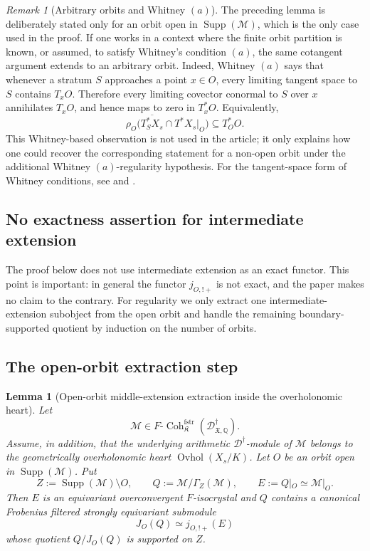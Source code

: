 \documentclass[11pt]{amsart}
\theoremstyle{plain}
\newtheorem{lemma}{Lemma}[section]
\theoremstyle{definition}
\theoremstyle{remark}
\newtheorem{remark}{Remark}[section]
\newcommand{\Ovhol}{\operatorname{Ovhol}}
\newcommand{\Coh}{\operatorname{Coh}}
\newcommand{\Supp}{\operatorname{Supp}}
\newcommand{\fstr}{\mathrm{fstr}}
\begin{document}
\begin{remark}[Arbitrary orbits and Whitney \((a)\)]
\label{rem:arbitrary-orbits-whitney-a}
The preceding lemma is deliberately stated only for an orbit open in
\(\Supp(\mathcal M)\), which is the only case used in the proof.  If one works
in a context where the finite orbit partition is known, or assumed, to satisfy
Whitney's condition \((a)\), the same cotangent argument extends to an arbitrary
orbit.  Indeed, Whitney \((a)\) says that whenever a stratum \(S\) approaches a
point \(x\in O\), every limiting tangent space to \(S\) contains
\(T_xO\).  Therefore every limiting covector conormal to \(S\) over \(x\)
annihilates \(T_xO\), and hence maps to zero in \(T_x^*O\).  Equivalently,
\[
  \rho_O\bigl(\overline{T^*_S X_s}\cap T^*X_s|_O\bigr)
  \subseteq T^*_O O.
\]
This Whitney-based observation is not used in the article; it only explains how
one could recover the corresponding statement for a non-open orbit under the
additional Whitney \((a)\)-regularity hypothesis.  For the tangent-space form of
Whitney conditions, see \cite[Part I, \S1.2]{GoreskyMacPherson} and
\cite[\S8.3]{KashiwaraSchapira}.
\end{remark}

\subsection{No exactness assertion for intermediate extension}

The proof below does not use intermediate extension as an exact functor.  This
point is important: in general the functor \(j_{O,!+}\) is not exact, and the
paper makes no claim to the contrary.  For regularity we only extract one
intermediate-extension subobject from the open orbit and handle the remaining
boundary-supported quotient by induction on the number of orbits.

\subsection{The open-orbit extraction step}

\begin{lemma}[Open-orbit middle-extension extraction inside the overholonomic heart]
\label{lem:middle-extension-extraction}
Let
\[
  \mathcal M\in
  F\text{-}\Coh^{\fstr}_{\mathfrak K}
  (\mathscr D^\dagger_{\mathfrak X,\mathbb Q}).
\]
Assume, in addition, that the underlying arithmetic
\(\mathscr D^\dagger\)-module of \(\mathcal M\) belongs to the geometrically
overholonomic heart \(\Ovhol(X_s/K)\).  Let \(O\) be an orbit open in
\(\Supp(\mathcal M)\).  Put
\[
  Z:=\Supp(\mathcal M)\setminus O,
  \qquad
  Q:=\mathcal M/\Gamma_Z(\mathcal M),
  \qquad
  E:=Q|_O\simeq\mathcal M|_O.
\]
Then \(E\) is an equivariant overconvergent \(F\)-isocrystal and \(Q\) contains
a canonical Frobenius filtered strongly equivariant submodule
\[
  J_O(Q)\simeq j_{O,!+}(E)
\]
whose quotient \(Q/J_O(Q)\) is supported on \(Z\).
\end{lemma}
\end{document}
